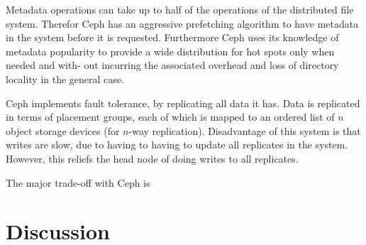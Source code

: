 \documentclass[a4paper,12px]{article}
\begin{document}
Metadata operations can take up to half of the operations of the distributed
file system. Therefor Ceph has an aggressive prefetching algorithm to have
metadata in the system before it is requested.  Furthermore Ceph uses its
knowledge of metadata popularity to provide a wide distribution for hot spots
only when needed and with- out incurring the associated overhead and loss of
directory locality in the general case.

Ceph implements fault tolerance, by replicating all data it has. Data is
replicated in terms of placement groups, each of which is mapped to an ordered
list of $n$ object storage devices (for $n$-way replication).
\cite{weil2006ceph} Disadvantage of this system is that writes are slow, due to
having to having to update all replicates in the system. However, this reliefs
the head node of doing writes to all replicates.

The major trade-off with Ceph is %



\section{Discussion}




\clearpage


\end{document}
